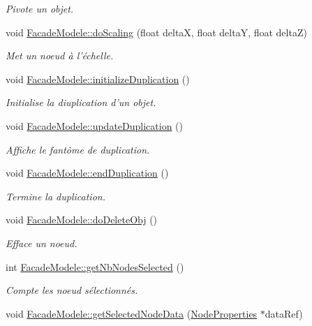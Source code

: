 \begin{DoxyCompactItemize}
\begin{DoxyCompactList}\small\item\em Pivote un objet. \end{DoxyCompactList}\item 
void \hyperlink{group__inf2990_gac8decb6e4a3eabfa6baa89022aaab8eb}{Facade\-Modele\-::do\-Scaling} (float delta\-X, float delta\-Y, float delta\-Z)
\begin{DoxyCompactList}\small\item\em Met un noeud à l'échelle. \end{DoxyCompactList}\item 
void \hyperlink{group__inf2990_ga6f50ec221ffc9a37a80fc87b9241000e}{Facade\-Modele\-::initialize\-Duplication} ()
\begin{DoxyCompactList}\small\item\em Initialise la diuplication d'un objet. \end{DoxyCompactList}\item 
void \hyperlink{group__inf2990_ga1a3e0ca25ffb4442968ce0977ca37d45}{Facade\-Modele\-::update\-Duplication} ()
\begin{DoxyCompactList}\small\item\em Affiche le fantôme de duplication. \end{DoxyCompactList}\item 
void \hyperlink{group__inf2990_ga236c0dba051c913078932ea1cf4a2e76}{Facade\-Modele\-::end\-Duplication} ()
\begin{DoxyCompactList}\small\item\em Termine la duplication. \end{DoxyCompactList}\item 
void \hyperlink{group__inf2990_gaa41bbec7d5381099ca3b945b6ed2675f}{Facade\-Modele\-::do\-Delete\-Obj} ()
\begin{DoxyCompactList}\small\item\em Efface un noeud. \end{DoxyCompactList}\item 
int \hyperlink{group__inf2990_gac85e226dae7761e7e98e0df151c5a766}{Facade\-Modele\-::get\-Nb\-Nodes\-Selected} ()
\begin{DoxyCompactList}\small\item\em Compte les noeud sélectionnés. \end{DoxyCompactList}\item 
void \hyperlink{group__inf2990_ga7dfe6c0df984dd4d2c5402d9fab0fc75}{Facade\-Modele\-::get\-Selected\-Node\-Data} (\hyperlink{struct_node_properties}{Node\-Properties} $\ast$data\-Ref)

\end{DoxyCompactItemize}
